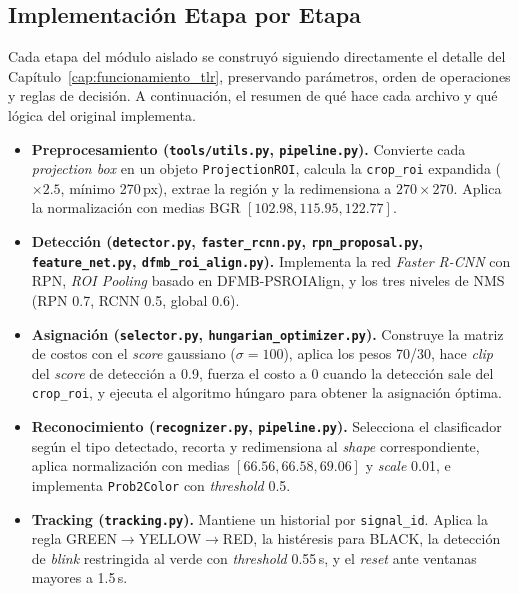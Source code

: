 \subsection{Implementación Etapa por Etapa}

Cada etapa del módulo aislado se construyó siguiendo directamente el detalle del Capítulo~\ref{cap:funcionamiento_tlr}, preservando parámetros, orden de operaciones y reglas de decisión. A continuación, el resumen de qué hace cada archivo y qué lógica del original implementa.

\begin{itemize}
    \item \textbf{Preprocesamiento (\texttt{tools/utils.py}, \texttt{pipeline.py}).} Convierte cada \textit{projection box} en un objeto \texttt{ProjectionROI}, calcula la \texttt{crop\_roi} expandida ($\times 2.5$, mínimo 270\,px), extrae la región y la redimensiona a $270\times270$. Aplica la normalización con medias BGR $[102.98, 115.95, 122.77]$.
    \item \textbf{Detección (\texttt{detector.py}, \texttt{faster\_rcnn.py}, \texttt{rpn\_proposal.py}, \texttt{feature\_net.py}, \texttt{dfmb\_roi\_align.py}).} Implementa la red \textit{Faster R-CNN} con RPN, \textit{ROI Pooling} basado en DFMB-PSROIAlign, y los tres niveles de NMS (RPN 0.7, RCNN 0.5, global 0.6).
    \item \textbf{Asignación (\texttt{selector.py}, \texttt{hungarian\_optimizer.py}).} Construye la matriz de costos con el \textit{score} gaussiano ($\sigma = 100$), aplica los pesos 70/30, hace \textit{clip} del \textit{score} de detección a 0.9, fuerza el costo a 0 cuando la detección sale del \texttt{crop\_roi}, y ejecuta el algoritmo húngaro para obtener la asignación óptima.
    \item \textbf{Reconocimiento (\texttt{recognizer.py}, \texttt{pipeline.py}).} Selecciona el clasificador según el tipo detectado, recorta y redimensiona al \textit{shape} correspondiente, aplica normalización con medias $[66.56, 66.58, 69.06]$ y \textit{scale} 0.01, e implementa \texttt{Prob2Color} con \textit{threshold} 0.5.
    \item \textbf{Tracking (\texttt{tracking.py}).} Mantiene un historial por \texttt{signal\_id}. Aplica la regla GREEN$\to$YELLOW$\to$RED, la histéresis para BLACK, la detección de \textit{blink} restringida al verde con \textit{threshold} 0.55\,s, y el \textit{reset} ante ventanas mayores a 1.5\,s.
\end{itemize}

